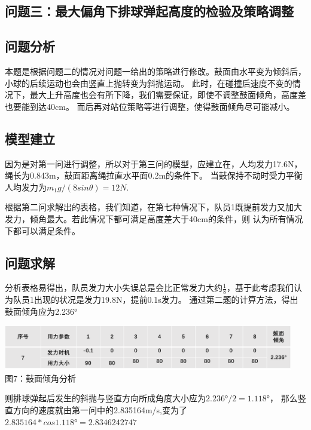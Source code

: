 \documentclass[UTF8]{article}
\begin{document}
\begin{center}
    \section{问题三：最大偏角下排球弹起高度的检验及策略调整}  
\end{center}

\subsection{问题分析}
本题是根据问题二的情况对问题一给出的策略进行修改。鼓面由水平变为倾斜后，小球的后续运动也会由竖直上抛转变为斜抛运动。
此时，在碰撞后速度不变的情况下，最大上升高度也会有所下降，我们需要保证，即使不调整鼓面倾角，高度差也要能到达40cm。
而后再对站位策略等进行调整，使得鼓面倾角尽可能减小。\\

\subsection{模型建立}
因为是对第一问进行调整，所以对于第三问的模型，应建立在，人均发力17.6N，绳长为0.843m，鼓面距离绳拉直水平面0.2m的条件下。
当鼓保持不动时受力平衡人均发力为$m_1g/(8sin\theta)=12N$.

根据第二问求解出的表格，我们知道，在第七种情况下，队员1既提前发力又加大发力，倾角最大。若此情况下都可满足高度差大于40cm的条件，则
认为所有情况下都可以满足条件。

\subsection{问题求解}
分析表格易得出，队员发力大小失误总是会比正常发力大约$\frac{1}{8}$，基于此考虑我们认为队员1出现的状况是发力19.8N，提前0.1s发力。
通过第二题的计算方法，得出鼓面倾角应为2.236°

\begin{center}
    \includegraphics[width=0.95\textwidth]{figure11.png}\\ 
    图7：鼓面倾角分析  
\end{center}

则排球弹起后发生的斜抛与竖直方向所成角度大小应为$2.236°/2=1.118°$，
那么竖直方向的速度就由第一问中的2.835164m/s,变为了$2.835164*cos1.118°=2.8346242747$
\end{document}
